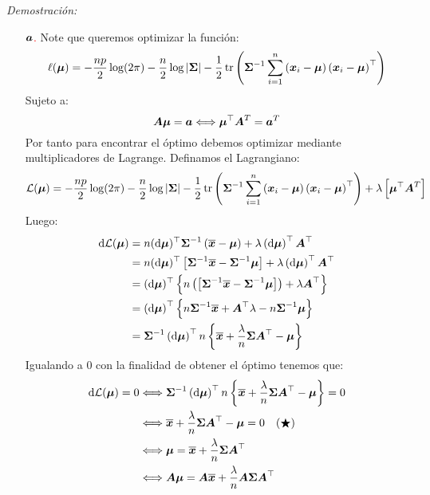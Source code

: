 \emph{Demostración:}
\begin{itemize}
\item[\textcolor{red}{$\bf{a}$.}] Note que queremos optimizar la función:
$$
\ell(\boldsymbol{\mu})=-\frac{np}{2}\log(2\pi)-\frac{n}{2} \log |\boldsymbol{\Sigma}|-\frac{1}{2} \operatorname{tr}\left( \boldsymbol{\Sigma}^{-1}\suma \parcurvo{
\bf{x}_i - \bf{\mu}
}\parcurvo{
\bf{x}_i - \bf{\mu}
}^\top\right)
$$
Sujeto a:
$$
\bf{A}\bf{\mu} = \bf{a} \ssi \bf{\mu}^\top \bf{A}^T = \bf{a}^T
$$
Por tanto para encontrar el óptimo debemos optimizar mediante multiplicadores de Lagrange. Definamos el Lagrangiano:
$$
\mathcal{L}(\bf{\mu}) = -\frac{np}{2}\log(2\pi)-\frac{n}{2} \log |\boldsymbol{\Sigma}|-\frac{1}{2} \operatorname{tr}\left( \boldsymbol{\Sigma}^{-1}\suma \parcurvo{
\bf{x}_i - \bf{\mu}
}\parcurvo{
\bf{x}_i - \bf{\mu}
}^\top\right) + \lambda \parcerrado{
 \bf{\mu}^\top \bf{A}^T 
}
$$
Luego:
\begin{align*}
\de \mathcal{L}(\bf{\mu}) &=
n (\de \bf{\mu})^\top 
    \bf{\Sigma}^{-1} \parcurvo{
\bf{\barra{x}} - \bf{\mu}
} + \lambda \parcurvo{\de\bf{\mu}}^\top\bf{A}^\top\\
&= n (\de \bf{\mu})^\top \parcerrado{
    \bf{\Sigma}^{-1} 
\bf{\barra{x}} - \bf{\Sigma}^{-1}\bf{\mu}}
 + \lambda \parcurvo{\de\bf{\mu}}^\top\bf{A}^\top\\
 &= (\de \bf{\mu})^\top\parllave{
    n\parcurvo{\parcerrado{
    \bf{\Sigma}^{-1} 
\bf{\barra{x}} - \bf{\Sigma}^{-1}\bf{\mu}}} + \lambda \bf{A}^\top
 }\\
 &= \parcurvo{\de \bf{\mu}}^\top \parllave{
    n\bf{\Sigma}^{-1}\barra{\bf{x}} + \bf{A}^\top\lambda - n\bf{\Sigma}^{-1}\bf{\mu}
 }\\
 &= \bf{\Sigma}^{-1}\parcurvo{\de \bf{\mu}}^\top n \parllave{
 \barra{\bf{x}} + \dfrac{\lambda}{n}\bf{\Sigma}\bf{A}^\top - \bf{\mu}
 }
\end{align*}
Igualando a 0 con la finalidad de obtener el óptimo tenemos que:
\begin{align*}
\de\mathcal{L}(\bf{\mu}) = 0 &\ssi \bf{\Sigma}^{-1}\parcurvo{\de \bf{\mu}}^\top n \parllave{
 \barra{\bf{x}} + \dfrac{\lambda}{n}\bf{\Sigma}\bf{A}^\top - \bf{\mu}
 }=0\\
  &\ssi \barra{\bf{x}} + \dfrac{\lambda}{n}\bf{\Sigma}\bf{A}^\top - \bf{\mu} = 0 \quad \estrella \\
     &\ssi \bf{\mu} = \barra{\bf{x}} + \dfrac{\lambda}{n}\bf{\Sigma}\bf{A}^\top\\
     &\ssi \bf{A}\bf{\mu} = \bf{A}
  \barra{\bf{x}} + \dfrac{\lambda}{n}\bf{A}\bf{\Sigma}\bf{A}^\top\\

\end{align*}
\end{itemize}
